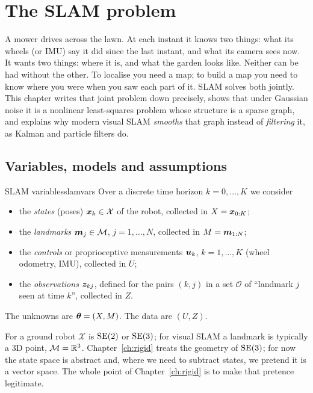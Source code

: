 \chapter{The SLAM problem}
\label{ch:slam}

A mower drives across the lawn. At each instant it knows two things: what
its wheels (or IMU) say it did since the last instant, and what its camera
sees now. It wants two things: where it is, and what the garden looks like.
Neither can be had without the other. To localise you need a map; to build
a map you need to know where you were when you saw each part of it. SLAM
solves both jointly. This chapter writes that joint problem down precisely,
shows that under Gaussian noise it is a nonlinear least-squares problem
whose structure is a sparse graph, and explains why modern visual SLAM
\emph{smooths} that graph instead of \emph{filtering} it, as Kalman and
particle filters do.

\section{Variables, models and assumptions}

\begin{definition}{SLAM variables}{slamvars}
Over a discrete time horizon $k=0,\dots,K$ we consider
\begin{itemize}[nosep]
\item the \emph{states} (poses) $\bm{x}_k\in\mathcal{X}$ of the robot, collected
  in $X=\bm{x}_{0:K}$;
\item the \emph{landmarks} $\bm{m}_j\in\mathcal{M}$, $j=1,\dots,N$, collected
  in $M=\bm{m}_{1:N}$;
\item the \emph{controls} or proprioceptive measurements $\bm{u}_k$,
  $k=1,\dots,K$ (wheel odometry, IMU), collected in $U$;
\item the \emph{observations} $\bm{z}_{kj}$, defined for the pairs $(k,j)$ in a
  set $\mathcal{O}$ of ``landmark $j$ seen at time $k$'', collected in $Z$.
\end{itemize}
The unknowns are $\bm{\theta}=(X,M)$. The data are $(U,Z)$.
\end{definition}

For a ground robot $\mathcal{X}$ is $\mathrm{SE}(2)$ or $\mathrm{SE}(3)$; for visual SLAM a
landmark is typically a 3D point, $\mathcal{M}=\mathbb{R}^3$. Chapter~\ref{ch:rigid}
treats the geometry of $\mathrm{SE}(3)$; for now the state space is abstract and,
where we need to subtract states, we pretend it is a vector space. The
whole point of Chapter~\ref{ch:rigid} is to make that pretence legitimate.

